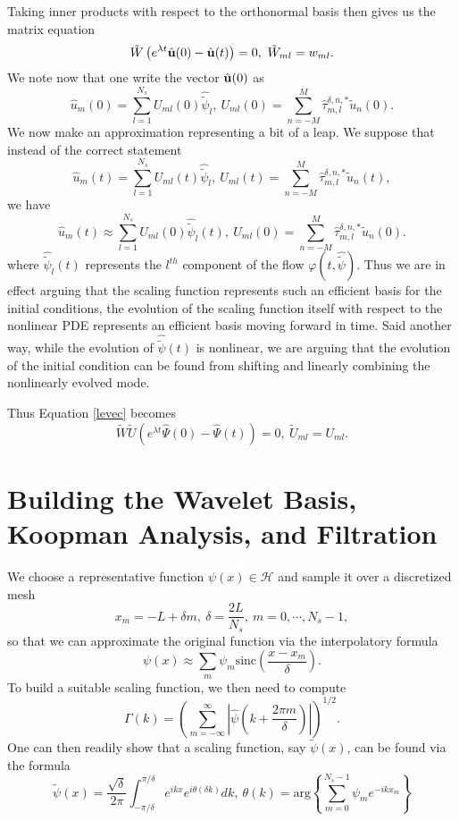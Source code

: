 \documentclass[a4paper,11pt]{article}
\begin{document}
Taking inner products with respect to the orthonormal basis then gives us the matrix equation
\begin{equation}
\tilde{W} \left(e^{\lambda t} \hat{{\bf u}}(0) - \hat{{\bf u}}(t)\right) = 0, ~ \tilde{W}_{ml} = w_{ml}.
\label{levec}
\end{equation}
We note now that one write the vector $\hat{{\bf u}}(0)$ as  
\[
\hat{u}_{m}(0) = \sum_{l=1}^{N_{s}}U_{ml}(0) \hat{\tilde{\psi}}_{l}, ~ U_{ml}(0) = \sum_{n=-M}^{M}\hat{\tau}^{\delta,n,\ast}_{m,l}\tilde{u}_{n}(0).
\]
We now make an approximation representing a bit of a leap.  We suppose that instead of the correct statement
\[
\hat{u}_{m}(t) = \sum_{l=1}^{N_{s}}U_{ml}(t) \hat{\tilde{\psi}}_{l}, ~ U_{ml}(t) = \sum_{n=-M}^{M}\hat{\tau}^{\delta,n,\ast}_{m,l}\tilde{u}_{n}(t),
\]
we have 
\[
\hat{u}_{m}(t) \approx \sum_{l=1}^{N_{s}}U_{ml}(0) \hat{\tilde{\psi}}_{l}(t), ~ U_{ml}(0) = \sum_{n=-M}^{M}\hat{\tau}^{\delta,n,\ast}_{m,l}\tilde{u}_{n}(0).
\]
where $\hat{\tilde{\psi}}_{l}(t)$ represents the $l^{th}$ component of the flow $\varphi\left(t,\hat{\tilde{\psi}} \right)$.  Thus we are in effect arguing that the scaling function represents such an efficient basis for the initial conditions, the evolution of the scaling function itself with respect to the nonlinear PDE represents an efficient basis moving forward in time.  Said another way, while the evolution of $\hat{\tilde{\psi}}(t)$ is nonlinear, we are arguing that the evolution of the initial condition can be found from shifting and linearly combining the nonlinearly evolved mode.

Thus Equation \eqref{levec} becomes 
\[
\tilde{W}\tilde{U} \left(e^{\lambda t} \hat{\Psi}(0) - \hat{\Psi}(t)\right) = 0, ~ \tilde{U}_{ml} = U_{ml}.
\]  
\section*{Building the Wavelet Basis, Koopman Analysis, and Filtration}
We choose a representative function $\psi(x)\in \mathcal{H}$ and sample it over a discretized mesh 
\[
x_{m} = -L + \delta m, ~\delta = \frac{2L}{N_{s}}, ~m=0,\cdots,N_{s}-1, 
\]
so that we can approximate the original function via the interpolatory formula
\[
\psi(x) \approx \sum_{m}\psi_{m}\mbox{sinc}\left(\frac{x-x_{m}}{\delta} \right).
\]
To build a suitable scaling function, we then need to compute 
\[
\Gamma(k) = \left(\sum_{m=-\infty}^{\infty}\left|\hat{\psi}\left(k + \frac{2\pi m}{\delta} \right) \right| \right)^{1/2}.
\]
One can then readily show that a scaling function, say $\tilde{\psi}(x)$, can be found via the formula 
\[
\tilde{\psi}(x) = \frac{\sqrt{\delta}}{2\pi}\int_{-\pi/\delta}^{\pi/\delta}e^{ikx} e^{i\theta(\delta k)} dk, ~ \theta(k) = \mbox{arg}\left\{ \sum_{m=0}^{N_{s}-1}\psi_{m}e^{-ik x_{m}}\right\} 
\]
\end{document}
